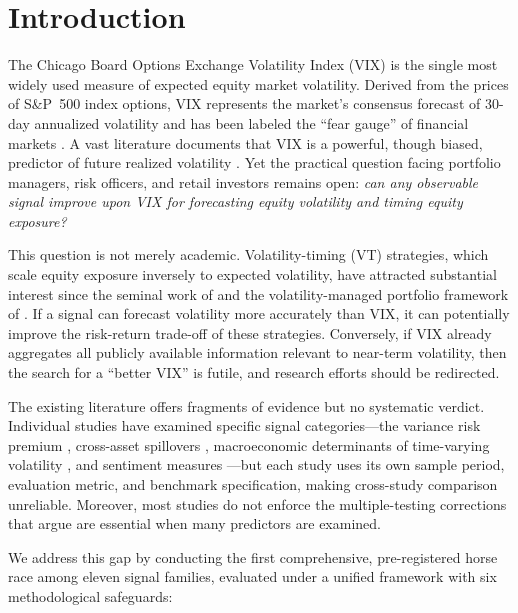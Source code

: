 \documentclass[12pt,a4paper]{article}
\begin{document}
\newpage
\tableofcontents
\newpage

\section{Introduction}
\label{sec:intro}

The Chicago Board Options Exchange Volatility Index (VIX) is the single most widely used measure of expected equity market volatility. Derived from the prices of S\&P~500 index options, VIX represents the market's consensus forecast of 30-day annualized volatility and has been labeled the ``fear gauge'' of financial markets \citep{whaley2000}. A vast literature documents that VIX is a powerful, though biased, predictor of future realized volatility \citep{christensen1998, jiang2005, bekaert2014}. Yet the practical question facing portfolio managers, risk officers, and retail investors remains open: \emph{can any observable signal improve upon VIX for forecasting equity volatility and timing equity exposure?}

This question is not merely academic. Volatility-timing (VT) strategies, which scale equity exposure inversely to expected volatility, have attracted substantial interest since the seminal work of \citet{fleming2001} and the volatility-managed portfolio framework of \citet{moreira2017}. If a signal can forecast volatility more accurately than VIX, it can potentially improve the risk-return trade-off of these strategies. Conversely, if VIX already aggregates all publicly available information relevant to near-term volatility, then the search for a ``better VIX'' is futile, and research efforts should be redirected.

The existing literature offers fragments of evidence but no systematic verdict. Individual studies have examined specific signal categories---the variance risk premium \citep{bollerslev2009}, cross-asset spillovers \citep{diebold2012}, macroeconomic determinants of time-varying volatility \citep{schwert1989, engle2008}, and sentiment measures \citep{baker2006}---but each study uses its own sample period, evaluation metric, and benchmark specification, making cross-study comparison unreliable. Moreover, most studies do not enforce the multiple-testing corrections that \citet{harvey2016} argue are essential when many predictors are examined.

We address this gap by conducting the first comprehensive, pre-registered horse race among eleven signal families, evaluated under a unified framework with six methodological safeguards:
\end{document}
